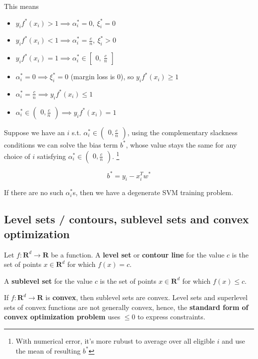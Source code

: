 \documentclass{article}
\begin{document}
This means

\begin{itemize}
  \item $y_i f^*(x_i) > 1 \implies \alpha_i^* = 0, ~\xi_i^* = 0$
  \item $y_i f^*(x_i) < 1 \implies \alpha_i^* = \frac{c}{n}, ~\xi_i^* > 0$
  \item $y_i f^*(x_i) = 1 \implies \alpha_i^* \in \begin{bmatrix}0, ~\frac{c}{n}\end{bmatrix}$
  \item $\alpha_i^* = 0   \implies \xi_i^* = 0$ (margin loss is 0), so $y_i f^*(x_i) \geq 1$
  \item $\alpha_i^* = \frac{c}{n} \implies y_i f^*(x_i) \leq 1$
  \item $\alpha_i^* \in \begin{pmatrix}0, \frac{c}{n}\end{pmatrix} \implies y_i f^*(x_i) = 1$
\end{itemize}

Suppose we have an $i$ s.t. $\alpha_i^* \in \begin{pmatrix}0, \frac{c}{n}\end{pmatrix}$, using the complementary slackness conditions we can solve the bias term $b^*$, whose value stays the same for any choice of $i$ satisfying $\alpha_i^* \in \begin{pmatrix}0, \frac{c}{n}\end{pmatrix}$.
\footnote{With numerical error, it's more rubust to average over all eligible $i$ and use the mean of resulting $b^*$}

$$
b^* = y_i - x_i^{T} w^*
$$

If there are no such $\alpha_i^*$s, then we have a degenerate SVM training problem.

\subsection{Level sets / contours, sublevel sets and convex optimization}

Let $f : \mathbf{R}^d \to \mathbf{R}$ be a function.
A \textbf{level set} or \textbf{contour line} for the value $c$ is the set of points $x \in \mathbf{R}^d$ for which $f(x) = c$.

A \textbf{sublevel set} for the value $c$ is the set of points $x \in \mathbf{R}^d$ for which $f(x) \leq c$.

If $f : \mathbf{R}^d \to \mathbf{R}$ is \textbf{convex}, then sublevel sets are convex.
Level sets and superlevel sets of convex functions are not generally convex, hence, the \textbf{standard form of convex optimization problem} uses $\leq 0$ to express constraints.
\end{document}
